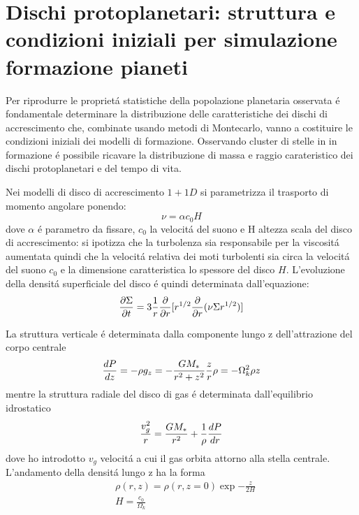 {\let\clearpage\relax\let\cleardoublepage\relax
	\chapter{Dischi protoplanetari: struttura e condizioni iniziali per simulazione formazione pianeti}
}

Per riprodurre le propriet\'a statistiche della popolazione planetaria osservata \'e fondamentale determinare la distribuzione delle caratteristiche dei dischi di accrescimento che, combinate usando metodi di Montecarlo, vanno a costituire le condizioni iniziali dei modelli di formazione. Osservando cluster di stelle in in formazione \'e possibile ricavare la distribuzione di massa e raggio carateristico dei dischi protoplanetari e del tempo di vita.


Nei modelli di disco di accrescimento $1+1D$ si parametrizza il trasporto di momento angolare ponendo:
\begin{equation}
\nu=\alpha c_0 H
\end{equation}
dove $\alpha$ \'e parametro da fissare, $c_0$ la velocit\'a del suono e H altezza scala del disco di accrescimento: si ipotizza che la turbolenza sia responsabile per la viscosit\'a aumentata quindi che la velocit\'a relativa dei moti turbolenti sia circa la velocit\'a del suono $c_0$ e la dimensione caratteristica lo spessore del disco $H$. L'evoluzione della densit\'a superficiale del disco \'e quindi determinata dall'equazione:
\begin{equation}
\PDy{t}{\Sigma}=3\frac{1}{r}\PDof{r}[r\expy{1/2}\PDof{r}(\nu\Sigma r\expy{1/2})]\label{eq:sigmaevol}
\end{equation}

La struttura verticale \'e determinata dalla componente lungo z dell'attrazione del corpo centrale
\begin{equation}
\TDy{z}{P}=-\rho g_z=-\frac{GM_*}{r^2+z^2}\frac{z}{r}\rho=-\Omega_k^2\rho z\label{eq:hydroz}
\end{equation}
mentre la struttura radiale del disco di gas \'e determinata dall'equilibrio idrostatico
\begin{equation}
\frac{v_g^2}{r}=\frac{GM_*}{r^2}+\frac{1}{\rho}\TDy{r}{P}
\end{equation}
dove ho introdotto $v_g$ velocit\'a a cui il gas orbita attorno alla stella centrale.
L'andamento della densit\'a lungo z ha la forma
\begin{align}
&\rho(r,z)=\rho(r,z=0)\exp{-\frac{z}{2H}}\\
&H=\frac{c_0}{\Omega_k}
\end{align}

